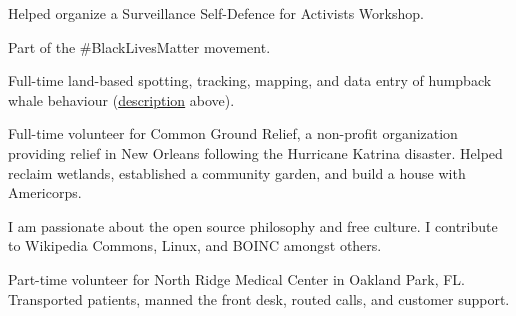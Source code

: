 \documentclass[a4paper,12pt]{article}
\begin{document}
        \begin{description}\setlength{\itemsep}{0mm}
        \item[2015] Helped organize a Surveillance Self-Defence for Activists Workshop.
        \item[2014 $\rightarrow$ Present] Part of the \#BlackLivesMatter movement.
        \item[2012] Full-time land-based spotting, tracking, mapping, and data entry of humpback whale behaviour (\hyperlink{whalevolunteering}{description} above).
        \item[2008] Full-time volunteer for Common Ground Relief, a non-profit organization providing relief in New Orleans following the Hurricane Katrina disaster. Helped reclaim wetlands, established a community garden, and build a house with Americorps.
        \item[2006 $\rightarrow$ Present] I am passionate about the open source philosophy and free culture. I contribute to Wikipedia Commons, Linux, and BOINC amongst others.
        \item[2006 $\rightarrow$ 2007] Part-time volunteer for North Ridge Medical Center in Oakland Park, FL.  Transported patients, manned the front desk, routed calls, and customer support.
        \end{description}
\end{document}
